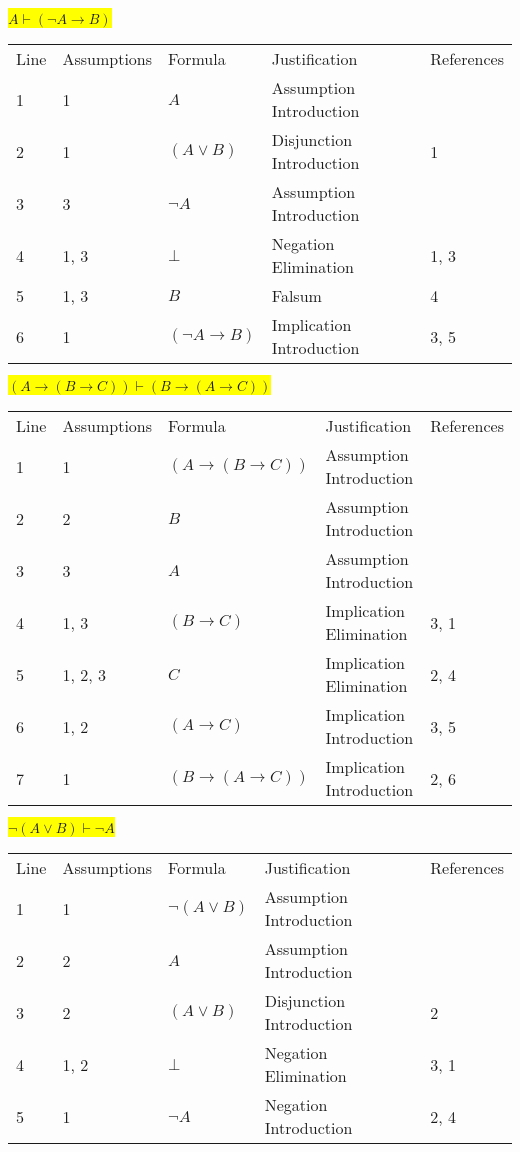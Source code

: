 \documentclass[12pt]{article}
\newcommand{\pr}[1]{\bigbreak \colorbox{Yellow}{$#1$} \smallbreak}
\begin{document}
\begin{flushleft}
\pr{A \vdash (\neg A \rightarrow B)}
\begin{tabular}{lllll}
    Line & Assumptions & Formula & Justification & References \\
    1 & 1 & $A$  & Assumption Introduction &  \\
    2 & 1 & $(A\lor B)$  & Disjunction Introduction & 1 \\
    3 & 3 & $\neg A$  & Assumption Introduction &  \\
    4 & 1, 3 & $\bot $  & Negation Elimination & 1, 3 \\
    5 & 1, 3 & $B$  & Falsum & 4 \\
    6 & 1 & $(\neg A\rightarrow B)$  & Implication Introduction & 3, 5 \\
\end{tabular}

\pr{(A\rightarrow (B\rightarrow C)) \vdash (B\rightarrow (A\rightarrow C))}
\begin{tabular}{lllll}
    Line & Assumptions & Formula & Justification & References \\
    1 & 1 & $(A\rightarrow (B\rightarrow C))$  & Assumption Introduction &  \\
    2 & 2 & $B$  & Assumption Introduction &  \\
    3 & 3 & $A$  & Assumption Introduction &  \\
    4 & 1, 3 & $(B\rightarrow C)$  & Implication Elimination & 3, 1 \\
    5 & 1, 2, 3 & $C$  & Implication Elimination & 2, 4 \\
    6 & 1, 2 & $(A\rightarrow C)$  & Implication Introduction & 3, 5 \\
    7 & 1 & $(B\rightarrow (A\rightarrow C))$  & Implication Introduction & 2, 6 \\
\end{tabular}

\pr{\neg (A \lor B) \vdash \neg A}
\begin{tabular}{lllll}
    Line & Assumptions & Formula & Justification & References \\
    1 & 1 & $\neg (A\lor B)$  & Assumption Introduction &  \\
    2 & 2 & $A$  & Assumption Introduction &  \\
    3 & 2 & $(A\lor B)$  & Disjunction Introduction & 2 \\
    4 & 1, 2 & $\bot $  & Negation Elimination & 3, 1 \\
    5 & 1 & $\neg A$  & Negation Introduction & 2, 4 \\
\end{tabular}


\end{flushleft}
\end{document}
